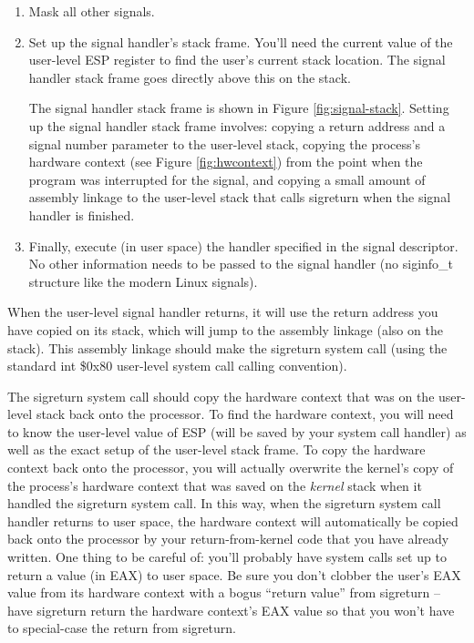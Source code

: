 \documentclass{article}
\begin{document}
\begin{enumerate}

	\item

	      Mask all other signals.

	\item

	      Set up the signal handler's stack frame.  You'll need the current value of the
	      user-level ESP register to find the user's current stack location.  The signal
	      handler stack frame goes directly above this on the stack.

	      The signal handler stack frame is shown in Figure \ref{fig:signal-stack}.
	      Setting up the signal handler stack frame involves: copying a return address
	      and a signal number parameter to the user-level stack, copying the process's
	      hardware context (see Figure \ref{fig:hwcontext}) from the point when the
	      program was interrupted for the signal, and copying a small amount of assembly
	      linkage to the user-level stack that calls {\fix sigreturn} when the signal
	      handler is finished.

	\item

	      Finally, execute (in user space) the handler specified in the signal
	      descriptor.  No other information needs to be passed to the signal handler (no
		      {\fix siginfo\_t} structure like the modern Linux signals).

\end{enumerate}

When the user-level signal handler returns, it will use the return
address you have copied on its stack, which will jump to the assembly linkage
(also on the stack).  This assembly linkage should make the {\fix sigreturn}
system call (using the standard {\fix int \$0x80} user-level system call
calling convention).

The {\fix sigreturn} system call should copy the hardware context that was on
the user-level stack back onto the processor.  To find the hardware context,
you will need to know the user-level value of ESP (will be saved by your
system call handler) as well as the exact setup of the user-level stack frame.
To copy the hardware context back onto the processor, you will actually
overwrite the kernel's copy of the process's hardware context that was saved
on the \textit{kernel} stack when it handled the {\fix sigreturn} system call.
In this way, when the {\fix sigreturn} system call handler returns to
user space, the hardware context will automatically be copied back onto the
processor by your return-from-kernel code that you have already written.  One
thing to be careful of: you'll probably have system calls set up to return a
value (in EAX) to user space.  Be sure you don't clobber the user's EAX value
from its hardware context with a bogus ``return value'' from {\fix sigreturn}
-- have {\fix sigreturn} return the hardware context's EAX value so that you
won't have to special-case the return from {\fix sigreturn}.
\end{document}
